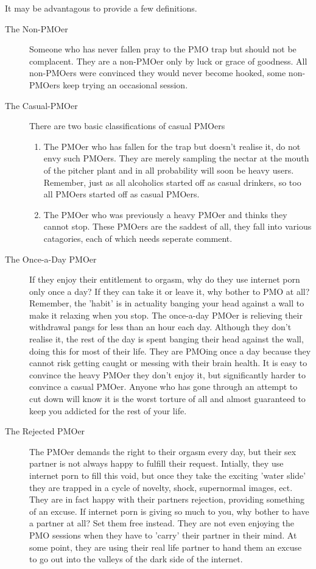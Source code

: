 \documentclass[easypeasy]{subfiles}
\begin{document}
It may be advantagous to provide a few definitions.
 \begin{description} 
   \item [The Non-PMOer] Someone who has never fallen pray to the PMO trap but should not be complacent. They are a non-PMOer only by luck or grace of goodness. All non-PMOers were convinced they would never become hooked, some non-PMOers keep trying an occasional session.

   \item [The Casual-PMOer] There are two basic classifications of casual PMOers
\begin{enumerate}
\item The PMOer who has fallen for the trap but doesn't realise it, do not envy such PMOers. They are merely sampling the nectar at the mouth of the pitcher plant and in all probability will soon be heavy users. Remember, just as all alcoholics started off as casual drinkers, so too all PMOers started off as casual PMOers.

\item The PMOer who was previously a heavy PMOer and thinks they cannot stop. These PMOers are the saddest of all, they fall into various catagories, each of which needs seperate comment.
\end{enumerate}
    \item [The Once-a-Day PMOer] If they enjoy their entitlement to orgasm, why do they use internet porn only once a day? If they can take it or leave it, why bother to PMO at all? Remember, the 'habit' is in actuality banging your head against a wall to make it relaxing when you stop. The once-a-day PMOer is relieving their withdrawal pangs for less than an hour each day. Although they don't realise it, the rest of the day is spent banging their head against the wall, doing this for most of their life. They are PMOing once a day because they cannot risk getting caught or messing with their brain health. It is easy to convince the heavy PMOer they don't enjoy it, but significantly harder to convince a casual PMOer. Anyone who has gone through an attempt to cut down will know it is the worst torture of all and almost guaranteed to keep you addicted for the rest of your life.

    \item [The Rejected PMOer] The PMOer demands the right to their orgasm every day, but their sex partner is not always happy to fulfill their request. Intially, they use internet porn to fill this void, but once they take the exciting 'water slide' they are trapped in a cycle of novelty, shock, supernormal images, ect. They are in fact happy with their partners rejection, providing something of an excuse. If internet porn is giving so much to you, why bother to have a partner at all? Set them free instead. They are not even enjoying the PMO sessions when they have to 'carry' their partner in their mind. At some point, they are using their real life partner to hand them an excuse to go out into the valleys of the dark side of the internet.


\end{description}
\end{document}
